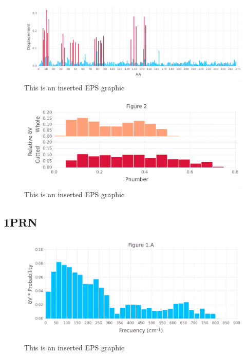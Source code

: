 \documentclass[10pt,letterpaper]{article}
\begin{document}
\begin{figure}[ht]
\begin{center}
\includegraphics[scale=0.5]{1m14/5figure.pdf}
\caption{This is an inserted EPS graphic}
\label{fig13}
\end{center}
\end{figure}

\begin{figure}[ht]
\begin{center}
\includegraphics[scale=0.5]{1m14/3_both.pdf}
\caption{This is an inserted EPS graphic}
\label{fig13}
\end{center}
\end{figure}

\FloatBarrier
\newpage

\subsection{1PRN}

\begin{figure}[ht]
\begin{center}
\includegraphics[scale=0.5]{1prn/1afigure.pdf}
\caption{This is an inserted EPS graphic}
\label{fig1}
\end{center}
\end{figure}
\end{document}
